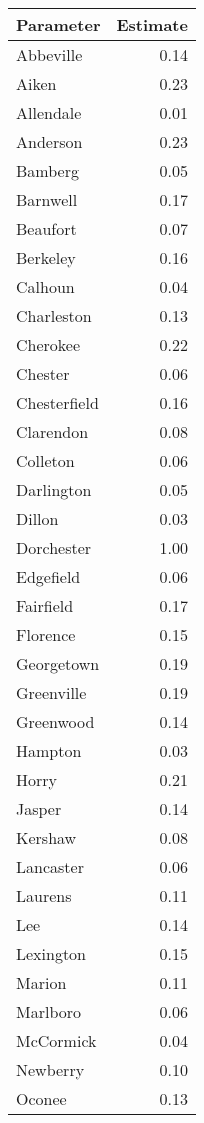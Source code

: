 \begin{tabular}{lr}
\toprule
   Parameter &  Estimate \\
\midrule
   Abbeville &      0.14 \\
       Aiken &      0.23 \\
   Allendale &      0.01 \\
    Anderson &      0.23 \\
     Bamberg &      0.05 \\
    Barnwell &      0.17 \\
    Beaufort &      0.07 \\
    Berkeley &      0.16 \\
     Calhoun &      0.04 \\
  Charleston &      0.13 \\
    Cherokee &      0.22 \\
     Chester &      0.06 \\
Chesterfield &      0.16 \\
   Clarendon &      0.08 \\
    Colleton &      0.06 \\
  Darlington &      0.05 \\
      Dillon &      0.03 \\
  Dorchester &      1.00 \\
   Edgefield &      0.06 \\
   Fairfield &      0.17 \\
    Florence &      0.15 \\
  Georgetown &      0.19 \\
  Greenville &      0.19 \\
   Greenwood &      0.14 \\
     Hampton &      0.03 \\
       Horry &      0.21 \\
      Jasper &      0.14 \\
     Kershaw &      0.08 \\
   Lancaster &      0.06 \\
     Laurens &      0.11 \\
         Lee &      0.14 \\
   Lexington &      0.15 \\
      Marion &      0.11 \\
    Marlboro &      0.06 \\
   McCormick &      0.04 \\
    Newberry &      0.10 \\
      Oconee &      0.13 \\

\end{tabular}
